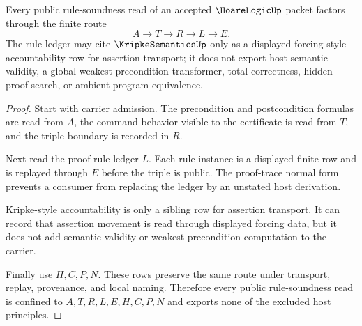 \begin{theorem}
\label{thm:hoare-logic-rule-soundness-ledger}
Every public rule-soundness read of an accepted $\HoareLogicUp$ packet factors through the finite route
$$
A \to T \to R \to L \to E .
$$
The rule ledger may cite $\KripkeSemanticsUp$ only as a displayed forcing-style accountability row for assertion transport; it does not export host semantic validity, a global weakest-precondition transformer, total correctness, hidden proof search, or ambient program equivalence.
\end{theorem}
\begin{proof}
Start with carrier admission. The precondition and postcondition formulas are read from $A$, the command behavior visible to the certificate is read from $T$, and the triple boundary is recorded in $R$.

Next read the proof-rule ledger $L$. Each rule instance is a displayed finite row and is replayed through $E$ before the triple is public. The proof-trace normal form prevents a consumer from replacing the ledger by an unstated host derivation.

Kripke-style accountability is only a sibling row for assertion transport. It can record that assertion movement is read through displayed forcing data, but it does not add semantic validity or weakest-precondition computation to the carrier.

Finally use $H,C,P,N$. These rows preserve the same route under transport, replay, provenance, and local naming. Therefore every public rule-soundness read is confined to $A,T,R,L,E,H,C,P,N$ and exports none of the excluded host principles.
\end{proof}




